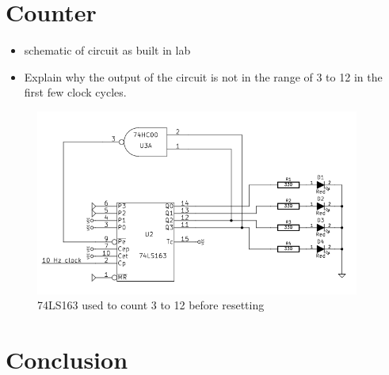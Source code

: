 \documentclass[11pt]{article}
\begin{document}
\section{Counter}
\begin{itemize}
	\item schematic of circuit as built in lab
	\item Explain why the output of the circuit is not in the range of 3 to 12 in the first few clock cycles.
\end{itemize}

\begin{figure}[htpb]
	\centering
	\includegraphics[width=0.95\textwidth]{schematic_counter}
	\caption{74LS163 used to count 3 to 12 before resetting}
	\label{fig:counter}
\end{figure}

\section{Conclusion}
\end{document}
